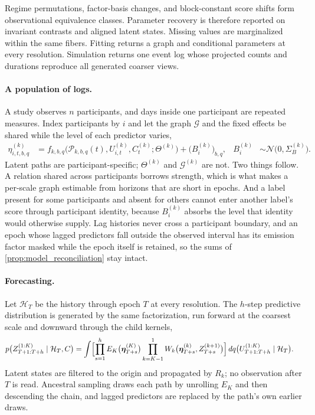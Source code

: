 Regime permutations, factor-basis changes, and block-constant score shifts
form observational equivalence classes. Parameter recovery is therefore
reported on invariant contrasts and aligned latent states. Missing values are
marginalized within the same fibers. Fitting returns a graph and conditional
parameters at every resolution. Simulation returns one event log whose
projected counts and durations reproduce all generated coarser views.

\paragraph{A population of logs.}
\label{sec:model_participants}

A study observes \(n\) participants, and days inside one participant are
repeated measures. Index participants by \(i\) and let the graph
\(\mathcal G\) and the fixed effects be shared while the level of each
predictor varies,
\begin{align}
 \eta_{i,t,b,q}^{(k)}
 &=f_{k,b,q}\bigl(\mathcal P_{k,b,q}(t),U_{i,t}^{(k)},C_t^{(k)};\Theta^{(k)}\bigr)
 +\bigl(B_i^{(k)}\bigr)_{b,q},
 &B_i^{(k)}&\sim\mathcal N\bigl(0,\Sigma_B^{(k)}\bigr).
 \label{eq:model_participant}
\end{align}
Latent paths are participant-specific; \(\Theta^{(k)}\) and
\(\mathcal G^{(k)}\) are not. Two things follow. A relation shared across
participants borrows strength, which is what makes a per-scale graph estimable
from horizons that are short in epochs. And a label present for some
participants and absent for others cannot enter another label's score through
participant identity, because \(B_i^{(k)}\) absorbs the level that identity
would otherwise supply. Lag histories never cross a participant boundary, and
an epoch whose lagged predictors fall outside the observed interval has its
emission factor masked while the epoch itself is retained, so the sums of
\cref{prop:model_reconciliation} stay intact.

\paragraph{Forecasting.}
\label{sec:model_forecast}

Let \(\mathcal H_T\) be the history through epoch \(T\) at every resolution.
The \(h\)-step predictive distribution is generated by the same factorization,
run forward at the coarsest scale and downward through the child kernels,
\begin{align}
 p\bigl(Z^{(1:K)}_{T+1:T+h}\mid\mathcal H_T,C\bigr)
 &=\int\Bigl[\prod_{s=1}^{h}
 E_K\bigl(\boldsymbol\eta^{(K)}_{T+s}\bigr)
 \prod_{k=K-1}^{1}
 W_k\bigl(\boldsymbol\eta^{(k)}_{T+s},Z^{(k+1)}_{T+s}\bigr)\Bigr]
 \,dq\bigl(U^{(1:K)}_{T+1:T+h}\mid\mathcal H_T\bigr).
 \label{eq:model_forecast}
\end{align}
Latent states are filtered to the origin and propagated by \(R_k\); no
observation after \(T\) is read. Ancestral sampling draws each path by
unrolling \(E_K\) and then descending the chain, and lagged predictors are
replaced by the path's own earlier draws.

